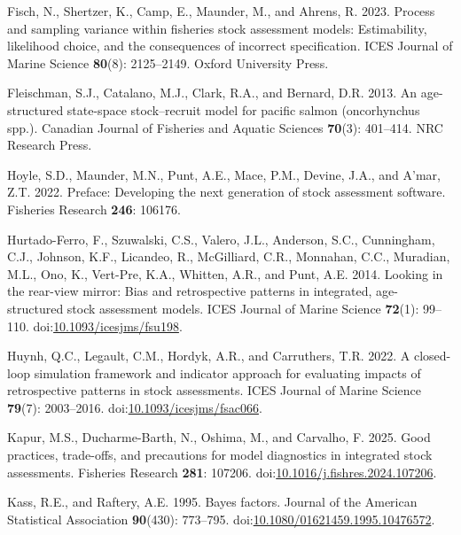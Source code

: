 \documentclass[
  12pt,
]{article}
\newlength{\cslhangindent}
\newlength{\cslentryspacingunit} %
\newenvironment{CSLReferences}[2] %
 {%
  \setlength{\parindent}{0pt}
  \ifodd #1
  \let\oldpar\par
  \def\par{\hangindent=\cslhangindent\oldpar}
  \fi
  \setlength{\parskip}{#2\cslentryspacingunit}
 }%
 {}
\begin{document}
\begin{CSLReferences}{1}{0}
\leavevmode{}%
Fisch, N., Shertzer, K., Camp, E., Maunder, M., and Ahrens, R. 2023.
Process and sampling variance within fisheries stock assessment models:
Estimability, likelihood choice, and the consequences of incorrect
specification. ICES Journal of Marine Science \textbf{80}(8):
2125--2149. Oxford University Press.

\leavevmode{}%
Fleischman, S.J., Catalano, M.J., Clark, R.A., and Bernard, D.R. 2013.
An age-structured state-space stock--recruit model for pacific salmon
(oncorhynchus spp.). Canadian Journal of Fisheries and Aquatic Sciences
\textbf{70}(3): 401--414. NRC Research Press.

\leavevmode{}%
Hoyle, S.D., Maunder, M.N., Punt, A.E., Mace, P.M., Devine, J.A., and
A'mar, Z.T. 2022. Preface: Developing the next generation of stock
assessment software. Fisheries Research \textbf{246}: 106176.

\leavevmode{}%
Hurtado-Ferro, F., Szuwalski, C.S., Valero, J.L., Anderson, S.C.,
Cunningham, C.J., Johnson, K.F., Licandeo, R., McGilliard, C.R.,
Monnahan, C.C., Muradian, M.L., Ono, K., Vert-Pre, K.A., Whitten, A.R.,
and Punt, A.E. 2014. Looking in the rear-view mirror: Bias and
retrospective patterns in integrated, age-structured stock assessment
models. ICES Journal of Marine Science \textbf{72}(1): 99--110.
doi:\href{https://doi.org/10.1093/icesjms/fsu198}{10.1093/icesjms/fsu198}.

\leavevmode{}%
Huynh, Q.C., Legault, C.M., Hordyk, A.R., and Carruthers, T.R. 2022. A
closed-loop simulation framework and indicator approach for evaluating
impacts of retrospective patterns in stock assessments. ICES Journal of
Marine Science \textbf{79}(7): 2003--2016.
doi:\href{https://doi.org/10.1093/icesjms/fsac066}{10.1093/icesjms/fsac066}.

\leavevmode{}%
Kapur, M.S., Ducharme-Barth, N., Oshima, M., and Carvalho, F. 2025. Good
practices, trade-offs, and precautions for model diagnostics in
integrated stock assessments. Fisheries Research \textbf{281}: 107206.
doi:\href{https://doi.org/10.1016/j.fishres.2024.107206}{10.1016/j.fishres.2024.107206}.

\leavevmode{}%
Kass, R.E., and Raftery, A.E. 1995. Bayes factors. Journal of the
American Statistical Association \textbf{90}(430): 773--795.
doi:\href{https://doi.org/10.1080/01621459.1995.10476572}{10.1080/01621459.1995.10476572}.


\end{CSLReferences}
\end{document}
